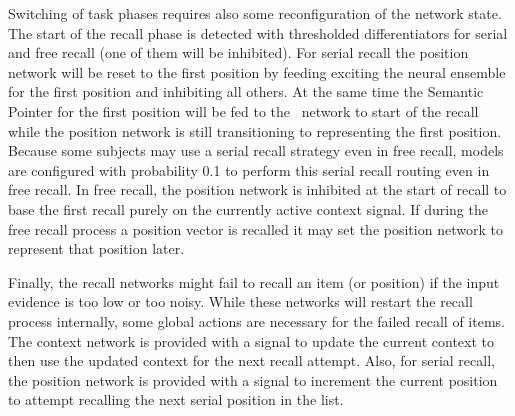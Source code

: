 Switching of task phases requires also some reconfiguration of the network state.
The start of the recall phase is detected with thresholded differentiators for serial and free recall (one of them will be inhibited).
For serial recall the position network will be reset to the first position by feeding exciting the neural ensemble for the first position and inhibiting all others.
At the same time the Semantic Pointer for the first position will be fed to the \mft\ network to start of the recall while the position network is still transitioning to representing the first position.
Because some subjects may use a serial recall strategy even in free recall, models are configured with probability \num{0.1} to perform this serial recall routing even in free recall.
In free recall, the position network is inhibited at the start of recall to base the first recall purely on the currently active context signal.
If during the free recall process a position vector is recalled it may set the position network to represent that position later.

Finally, the recall networks might fail to recall an item (or position) if the input evidence is too low or too noisy.
While these networks will restart the recall process internally, some global actions are necessary for the failed recall of items.
The context network is provided with a signal to update the current context to then use the updated context for the next recall attempt.
Also, for serial recall, the position network is provided with a signal to increment the current position to attempt recalling the next serial position in the list.
